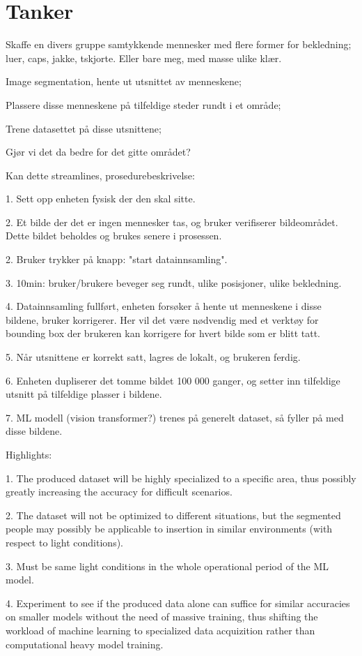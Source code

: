 \section{Tanker}
Skaffe en divers gruppe samtykkende mennesker med flere former for bekledning; luer, caps, jakke, tskjorte. Eller bare meg, med masse ulike klær.

Image segmentation, hente ut utsnittet av menneskene;

Plassere disse menneskene på tilfeldige steder rundt i et område;

Trene datasettet på disse utsnittene;

Gjør vi det da bedre for det gitte området?


Kan dette streamlines, prosedurebeskrivelse:

1. Sett opp enheten fysisk der den skal sitte. 

2. Et bilde der det er ingen mennesker tas, og bruker verifiserer bildeområdet. Dette bildet beholdes og brukes senere i prosessen.

2. Bruker trykker på knapp: "start datainnsamling".

3. 10min: bruker/brukere beveger seg rundt, ulike posisjoner, ulike bekledning.

4. Datainnsamling fullført, enheten forsøker å hente ut menneskene i disse bildene, bruker korrigerer. Her vil det være nødvendig med et verktøy for bounding box der brukeren kan korrigere for hvert bilde som er blitt tatt.

5. Når utsnittene er korrekt satt, lagres de lokalt, og brukeren ferdig.

6. Enheten dupliserer det tomme bildet 100 000 ganger, og setter inn tilfeldige utsnitt på tilfeldige plasser i bildene. 

7. ML modell (vision transformer?) trenes på generelt dataset, så fyller på med disse bildene.


Highlights:

1. The produced dataset will be highly specialized to a specific area, thus possibly greatly increasing the accuracy for difficult scenarios.

2. The dataset will not be optimized to different situations, but the segmented people may possibly be applicable to insertion in similar environments (with respect to light conditions). 

3. Must be same light conditions in the whole operational period of the ML model.

4. Experiment to see if the produced data alone can suffice for similar accuracies on smaller models without the need of massive training, thus shifting the workload of machine learning to specialized data acquizition rather than computational heavy model training.


